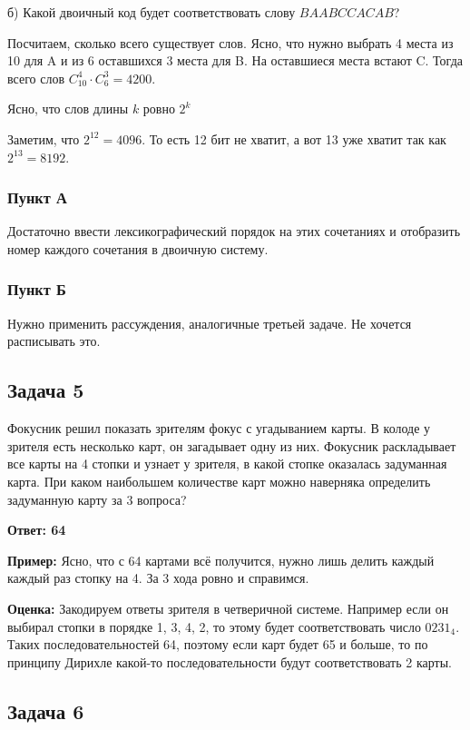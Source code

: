 б) Какой двоичный код будет соответствовать слову $BAABCCACAB$?

Посчитаем, сколько всего существует слов. Ясно, что нужно выбрать 4 места из 10 для A и из 6 оставшихся 3 места для B. На оставшиеся места встают C. Тогда всего слов $C^4_{10} \cdot C^3_6 = 4200$.

Ясно, что слов длины $k$ ровно $2^{k}$

Заметим, что $2^{12} = 4096$. То есть 12 бит не хватит, а вот 13 уже хватит так как $2^{13} = 8192$.

\subsubsection{Пункт А}

Достаточно ввести лексикографический порядок на этих сочетаниях и отобразить номер каждого сочетания в двоичную систему.

\subsubsection{Пункт Б}

Нужно применить рассуждения, аналогичные третьей задаче. Не хочется расписывать это.

\subsection{Задача 5}

Фокусник решил показать зрителям фокус с угадыванием карты. В колоде у зрителя
есть несколько карт, он загадывает одну из них. Фокусник раскладывает все карты на
4 стопки и узнает у зрителя, в какой стопке оказалась задуманная карта. При каком
наибольшем количестве карт можно наверняка определить задуманную карту за 3
вопроса?

\textbf{Ответ: 64}

\textbf{Пример:} Ясно, что с 64 картами всё получится, нужно лишь делить каждый каждый раз стопку на 4. За 3 хода ровно и справимся.

\textbf{Оценка:} Закодируем ответы зрителя в четверичной системе. Например если он выбирал стопки в порядке 1, 3, 4, 2, то этому будет соответствовать число $0231_4$. Таких последовательностей 64, поэтому если карт будет 65 и больше, то по принципу Дирихле какой-то последовательности будут соответствовать 2 карты.

\subsection{Задача 6}

